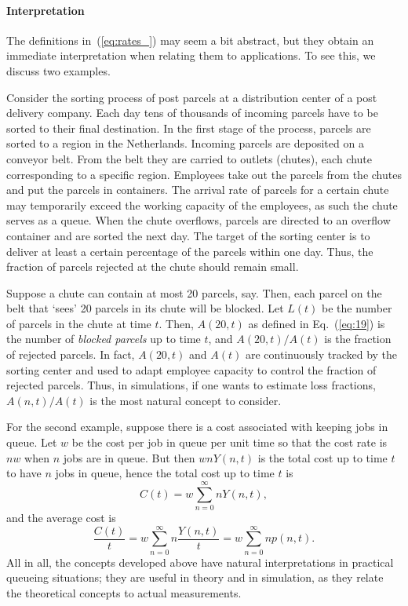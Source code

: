\paragraph{Interpretation}

The definitions in~(\ref{eq:rates_}) may seem a bit abstract, but they
obtain an immediate interpretation when relating them to
applications. To see this, we discuss two examples.

Consider the sorting process of post parcels at a distribution center
of a post delivery company.  Each day tens of thousands of incoming
parcels have to be sorted to their final destination. In the first
stage of the process, parcels are sorted to a region in the
Netherlands. Incoming parcels are deposited on a conveyor belt. From
the belt they are carried to outlets (chutes), each chute
corresponding to a specific region. Employees take out the parcels
from the chutes and put the parcels in containers.  The arrival rate
of parcels for a certain chute may temporarily exceed the working
capacity of the employees, as such the chute serves as a queue.  When
the chute overflows, parcels are directed to an overflow container and
are sorted the next day. The target of the sorting center is to
deliver at least a certain percentage of the parcels within one
day. Thus, the fraction of parcels rejected at the chute should remain
small.

Suppose a chute can contain at most 20 parcels, say. Then, each parcel
on the belt that `sees' 20 parcels in its chute will be blocked. Let
$L(t)$ be the number of parcels in the chute at time $t$. Then,
$A(20,t)$ as defined in Eq.~(\ref{eq:19}) is the number of\emph{ blocked
  parcels} up to time $t$, and $A(20,t)/A(t)$ is the fraction of
rejected parcels. In fact, $A(20,t)$ and $A(t)$ are continuously
tracked by the sorting center and used to adapt employee capacity to
control the fraction of rejected parcels. Thus, in simulations, if one
wants to estimate loss fractions, $A(n,t)/A(t)$ is the most natural
concept to consider.

For the second example, suppose there is a cost associated with
keeping jobs in queue. Let $w$ be the cost per job in queue per unit
time so that the cost rate is $n w$ when $n$ jobs are in queue. But
then $ w n Y(n,t)$ is the total cost up to time $t$ to have $n$ jobs in
queue, hence the total cost up to time $t$ is
  \begin{equation*}
C(t) =     w \sum_{n=0}^\infty n Y(n,t),
  \end{equation*}
and the average cost is
\begin{equation*}
\frac{C(t)}t =    w \sum_{n=0}^\infty n \frac{Y(n,t)}t = w \sum_{n=0}^\infty n p(n,t).
\end{equation*}
All in all, the concepts developed above have natural interpretations
in practical queueing situations; they are useful in theory and in
simulation, as they relate the theoretical concepts to actual measurements.



